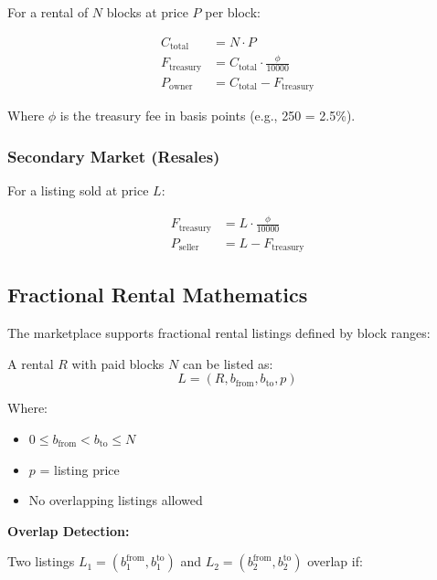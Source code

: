 \documentclass[12pt,a4paper]{article}
\begin{document}
For a rental of $N$ blocks at price $P$ per block:

\begin{align}
C_{\text{total}} &= N \cdot P \\
F_{\text{treasury}} &= C_{\text{total}} \cdot \frac{\phi}{10000} \\
P_{\text{owner}} &= C_{\text{total}} - F_{\text{treasury}}
\end{align}

Where $\phi$ is the treasury fee in basis points (e.g., 250 = 2.5\%).

\subsubsection{Secondary Market (Resales)}

For a listing sold at price $L$:

\begin{align}
F_{\text{treasury}} &= L \cdot \frac{\phi}{10000} \\
P_{\text{seller}} &= L - F_{\text{treasury}}
\end{align}

\subsection{Fractional Rental Mathematics}

The marketplace supports fractional rental listings defined by block ranges:

\begin{tcolorbox}[colback=primaryblue!5,colframe=primaryblue,title=Fractional Listing]
A rental $R$ with paid blocks $N$ can be listed as:
\begin{equation}
L = (R, b_{\text{from}}, b_{\text{to}}, p)
\end{equation}

Where:
\begin{itemize}
    \item $0 \leq b_{\text{from}} < b_{\text{to}} \leq N$
    \item $p$ = listing price
    \item No overlapping listings allowed
\end{itemize}
\end{tcolorbox}

\textbf{Overlap Detection:}

Two listings $L_1 = (b_1^{\text{from}}, b_1^{\text{to}})$ and $L_2 = (b_2^{\text{from}}, b_2^{\text{to}})$ overlap if:
\end{document}
